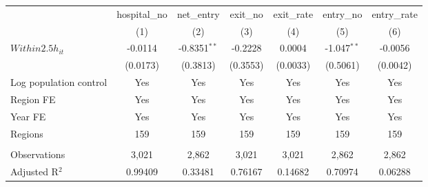 \begingroup
\centering
\begin{tabular}{lcccccc}
   \toprule
                          & hospital\_no  & net\_entry     & exit\_no  & exit\_rate  & entry\_no     & entry\_rate \\    
                          & (1)           & (2)            & (3)       & (4)         & (5)           & (6)\\  
   \midrule 
   $Within2.5h_{it}$      & -0.0114       & -0.8351$^{**}$ & -0.2228   & 0.0004      & -1.047$^{**}$ & -0.0056\\   
                          & (0.0173)      & (0.3813)       & (0.3553)  & (0.0033)    & (0.5061)      & (0.0042)\\   
   Log population control & Yes           & Yes            & Yes       & Yes         & Yes           & Yes\\  
   Region FE              & Yes           & Yes            & Yes       & Yes         & Yes           & Yes\\  
   Year FE                & Yes           & Yes            & Yes       & Yes         & Yes           & Yes\\  
   Regions                & 159           & 159            & 159       & 159         & 159           & 159\\  
    \\
   Observations           & 3,021         & 2,862          & 3,021     & 3,021       & 2,862         & 2,862\\  
   Adjusted R$^2$         & 0.99409       & 0.33481        & 0.76167   & 0.14682     & 0.70974       & 0.06288\\  
   \bottomrule
\end{tabular}
\par\endgroup
